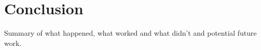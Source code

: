 \chapter{Conclusion}

Summary of what happened, what worked and what didn't and potential future work.